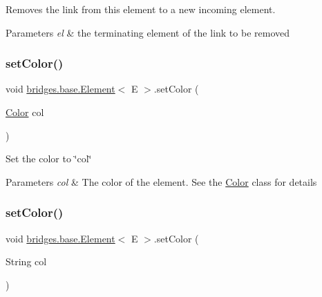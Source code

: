 Removes the link from this element to a new incoming element. 


\begin{DoxyParams}{Parameters}
{\em el} & the terminating element of the link to be removed \\
\hline
\end{DoxyParams}
\mbox{\label{classbridges_1_1base_1_1_element_aeb3336746d41a180e50b5efaff2dedc2}} 
\subsubsection{\texorpdfstring{set\+Color()}{setColor()}\hspace{0.1cm}{\footnotesize\ttfamily [1/2]}}
{\footnotesize\ttfamily void \hyperlink{classbridges_1_1base_1_1_element}{bridges.\+base.\+Element}$<$ E $>$.set\+Color (\begin{DoxyParamCaption}\item[{\hyperlink{classbridges_1_1base_1_1_color}{Color}}]{col }\end{DoxyParamCaption})}

Set the color to \char`\"{}col\char`\"{} 
\begin{DoxyParams}{Parameters}
{\em col} & The color of the element. See the \hyperlink{classbridges_1_1base_1_1_color}{Color} class for details \\
\hline
\end{DoxyParams}
\mbox{\label{classbridges_1_1base_1_1_element_a336f2ff70a0873fde6f0b8a43b670ffc}} 
\subsubsection{\texorpdfstring{set\+Color()}{setColor()}\hspace{0.1cm}{\footnotesize\ttfamily [2/2]}}
{\footnotesize\ttfamily void \hyperlink{classbridges_1_1base_1_1_element}{bridges.\+base.\+Element}$<$ E $>$.set\+Color (\begin{DoxyParamCaption}\item[{String}]{col }\end{DoxyParamCaption})}



